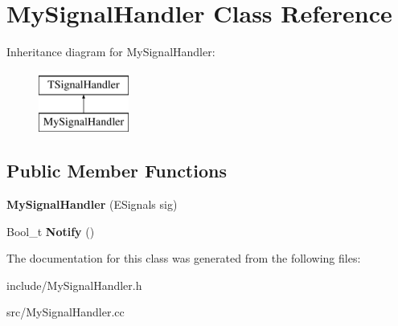 \hypertarget{classMySignalHandler}{\section{My\-Signal\-Handler Class Reference}
\label{classMySignalHandler}
}
Inheritance diagram for My\-Signal\-Handler\-:\begin{figure}[H]
\begin{center}
\leavevmode
\includegraphics[height=2.000000cm]{classMySignalHandler}
\end{center}
\end{figure}
\subsection*{Public Member Functions}
\begin{DoxyCompactItemize}
\item 
\hypertarget{classMySignalHandler_a999b062d66e959846881d8adc47e8c97}{{\bfseries My\-Signal\-Handler} (E\-Signals sig)}\label{classMySignalHandler_a999b062d66e959846881d8adc47e8c97}

\item 
\hypertarget{classMySignalHandler_ac5fcaa3a73fd39f00b7c43eca04901ea}{Bool\-\_\-t {\bfseries Notify} ()}\label{classMySignalHandler_ac5fcaa3a73fd39f00b7c43eca04901ea}

\end{DoxyCompactItemize}


The documentation for this class was generated from the following files\-:\begin{DoxyCompactItemize}
\item 
include/My\-Signal\-Handler.\-h\item 
src/My\-Signal\-Handler.\-cc\end{DoxyCompactItemize}
